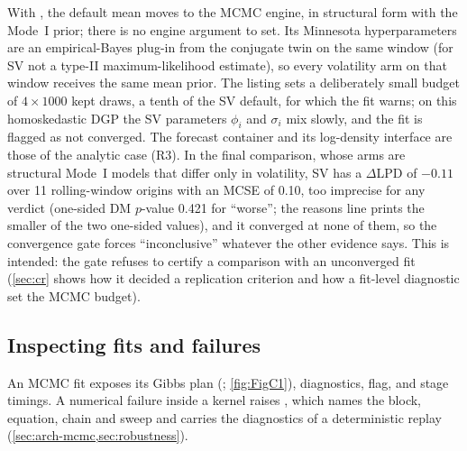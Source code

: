 With , the default mean  moves to the MCMC engine,
in structural form with the Mode~I prior; there is no engine argument to set.
Its Minnesota hyperparameters are an empirical-Bayes plug-in from the conjugate twin on the same
window (for SV not a type-II maximum-likelihood estimate), so every volatility arm on that window
receives the same mean prior.
The listing sets a deliberately small budget of $4 \times 1000$ kept draws, a tenth of the SV
default, for which the fit warns; on this homoskedastic DGP the SV parameters $\phi_i$ and
$\sigma_i$ mix slowly, and the fit is flagged as not converged.
The forecast container and its log-density interface are those of the analytic case (R3).
In the final comparison, whose arms are structural Mode~I models that differ only in volatility,
SV has a $\Delta$LPD of $-0.11$ over 11 rolling-window origins with an MCSE of 0.10, too imprecise
for any verdict (one-sided DM $p$-value 0.421 for ``worse''; the reasons line prints the smaller
of the two one-sided values), and it converged at none of them, so the
convergence gate forces ``inconclusive'' whatever the other evidence says.
This is intended: the gate refuses to certify a comparison with an unconverged fit (\cref{sec:cr}
shows how it decided a replication criterion and how a fit-level diagnostic set the MCMC budget).

\subsection{Inspecting fits and failures}\label{sec:walk-inspect}

An MCMC fit exposes its Gibbs plan (; \cref{fig:FigC1}), diagnostics,
 flag,  and stage timings.
A numerical failure inside a kernel raises , which names the block,
equation, chain and sweep and carries the diagnostics of a deterministic replay
(\cref{sec:arch-mcmc,sec:robustness}).
